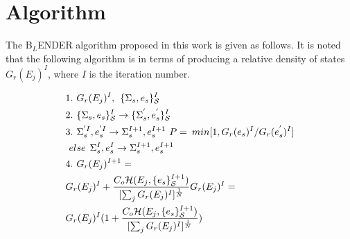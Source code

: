 \documentclass[aps,prl,reprint,superscriptaddress,showkeys]{revtex4-1}
\begin{document}
\section{Algorithm}
   
The B$_{L}$ENDER algorithm proposed in this work  is given as follows. It is noted that the following algorithm is in terms of producing a relative density of states $G_{r}(E_j)^I$, where $I$ is the iteration number. 

\begin{equation}
\begin{split}
&1.\hspace{0.125cm} G_{r}(E_j)^I ,\hspace{0.15cm}  \{\Sigma_{s},e_s\}_{\mathcal{S}}^I\\
&2. \hspace{0.125cm}\{\Sigma_{s},e_s\}_{\mathcal{S}}^I \rightarrow  \{\Sigma_{s}^{'},e_s^{'}\}_{\mathcal{S}}^I\\
&3. \hspace{0.125cm} \Sigma_{s}^{'I}, e_s^{'I} \rightarrow \Sigma_{s}^{I+1},e_s^{I+1}   \hspace{0.125cm} P = \hspace{0.075cm} min [1, G_r(e_s)^{I}/G_r(e_s^{'})^{I}]\\
& \hspace{0.125cm}else  \hspace{0.15cm} \Sigma_{s}^I, e_s^I \rightarrow \Sigma_{s}^{I+1}, e_s^{I+1}\\
&4. \hspace{0.125cm} G_{r}(E_j)^{I+1} =  \\
& G_{r}(E_j)^{I} + \frac{C_o \mathcal{H}(E_j,\{e_s\}_{\mathcal{S}}^{I+1}) }{ [\sum_j G_{r}(E_j)^{I}]^{\frac{1}{N} } }G_{r}(E_j)^{I} = \\
& G_{r}(E_j)^{I}( 1 +  \frac{C_o \mathcal{H}(E_j,\{e_s\}_{\mathcal{S}}^{I+1}) }{ [\sum_j G_{r}(E_j)^{I}]^{\frac{1}{N} } } )\\
\end{split}
\label{blender}
\end{equation}
\end{document}
